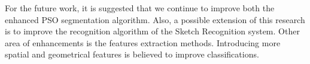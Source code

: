 \documentclass[preprint,1p,times,review]{elsarticle}
\begin{document}
 For the future work, it is suggested that we continue to improve both the enhanced PSO segmentation algorithm. Also, a possible extension of this research is to improve the recognition algorithm of the Sketch Recognition system. Other area of enhancements is the features extraction methods. Introducing more spatial and geometrical features is believed to improve classifications.

%


\end{document}
